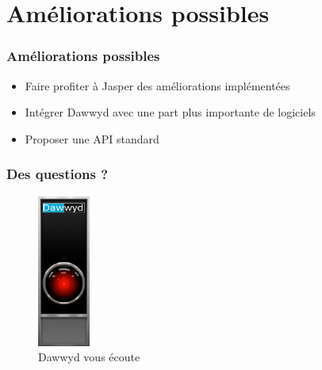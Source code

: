 \documentclass{beamer}
\begin{document}
\section{Améliorations possibles}

\begin{frame}
	\frametitle{Améliorations possibles}
	\begin{itemize}
		\setlength\itemsep{2em}
		\item Faire profiter à Jasper des améliorations implémentées
		\item Intégrer Dawwyd avec une part plus importante de logiciels
		\item Proposer une API standard
	\end{itemize}
\end{frame}

\begin{frame}
	\frametitle{Des questions ?}
	\centering
	\begin{figure}
	\includegraphics[height=5cm]{hal_dawwyd}
	\caption{Dawwyd vous écoute}
	\end{figure}
\end{frame}
\end{document}
